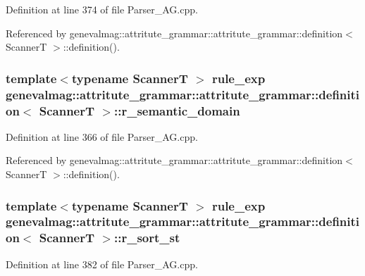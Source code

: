 Definition at line 374 of file Parser\_\-AG.cpp.

Referenced by genevalmag::attritute\_\-grammar::attritute\_\-grammar::definition$<$ ScannerT $>$::definition().\hypertarget{structgenevalmag_1_1attritute__grammar_1_1definition_262b3235ca89b3296d840c4b5741d2f7}{
\subsubsection[{r\_\-semantic\_\-domain}]{\setlength{\rightskip}{0pt plus 5cm}template$<$typename ScannerT $>$ {\bf rule\_\-exp} genevalmag::attritute\_\-grammar::attritute\_\-grammar::definition$<$ ScannerT $>$::{\bf r\_\-semantic\_\-domain}}}
\label{structgenevalmag_1_1attritute__grammar_1_1definition_262b3235ca89b3296d840c4b5741d2f7}




Definition at line 366 of file Parser\_\-AG.cpp.

Referenced by genevalmag::attritute\_\-grammar::attritute\_\-grammar::definition$<$ ScannerT $>$::definition().\hypertarget{structgenevalmag_1_1attritute__grammar_1_1definition_46912025e1064167e22c184bd6f030c9}{
\subsubsection[{r\_\-sort\_\-st}]{\setlength{\rightskip}{0pt plus 5cm}template$<$typename ScannerT $>$ {\bf rule\_\-exp} genevalmag::attritute\_\-grammar::attritute\_\-grammar::definition$<$ ScannerT $>$::{\bf r\_\-sort\_\-st}}}
\label{structgenevalmag_1_1attritute__grammar_1_1definition_46912025e1064167e22c184bd6f030c9}




Definition at line 382 of file Parser\_\-AG.cpp.

